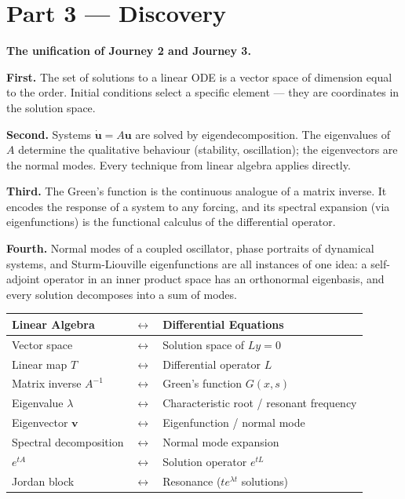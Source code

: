 \documentclass[12pt,a4paper]{article}
\begin{document}
\section{Part 3 \texorpdfstring{---}{--} Discovery}

\begin{discoverybox}
\textbf{The unification of Journey 2 and Journey 3.}

\textbf{First.} The set of solutions to a linear ODE is a vector space of dimension equal to the order. Initial conditions select a specific element --- they are coordinates in the solution space.

\textbf{Second.} Systems $\dot{\mathbf{u}} = A\mathbf{u}$ are solved by eigendecomposition. The eigenvalues of $A$ determine the qualitative behaviour (stability, oscillation); the eigenvectors are the normal modes. Every technique from linear algebra applies directly.

\textbf{Third.} The Green's function is the continuous analogue of a matrix inverse. It encodes the response of a system to any forcing, and its spectral expansion (via eigenfunctions) is the functional calculus of the differential operator.

\textbf{Fourth.} Normal modes of a coupled oscillator, phase portraits of dynamical systems, and Sturm-Liouville eigenfunctions are all instances of one idea: a self-adjoint operator in an inner product space has an orthonormal eigenbasis, and every solution decomposes into a sum of modes.

\medskip
\begin{center}
\renewcommand{\arraystretch}{1.5}
\begin{tabular}{l l l}
\toprule
\textbf{Linear Algebra} & $\longleftrightarrow$ & \textbf{Differential Equations} \\
\midrule
Vector space & $\longleftrightarrow$ & Solution space of $Ly=0$ \\
Linear map $T$ & $\longleftrightarrow$ & Differential operator $L$ \\
Matrix inverse $A^{-1}$ & $\longleftrightarrow$ & Green's function $G(x,s)$ \\
Eigenvalue $\lambda$ & $\longleftrightarrow$ & Characteristic root / resonant frequency \\
Eigenvector $\mathbf{v}$ & $\longleftrightarrow$ & Eigenfunction / normal mode \\
Spectral decomposition & $\longleftrightarrow$ & Normal mode expansion \\
$e^{tA}$ & $\longleftrightarrow$ & Solution operator $e^{tL}$ \\
Jordan block & $\longleftrightarrow$ & Resonance ($te^{\lambda t}$ solutions) \\
\bottomrule
\end{tabular}
\end{center}


\end{discoverybox}
\end{document}
